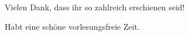 \begin{frame}[standout]
\begin{center}
    Vielen Dank, dass ihr so zahlreich erschienen seid!

    Habt eine schöne vorlesungsfreie Zeit.
\end{center}
\end{frame}


